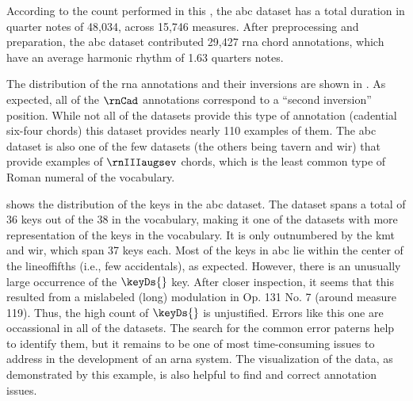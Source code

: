 
According to the count performed in this \thesisdiss{}, the
\gls{abc} dataset has a total duration in quarter notes of
48,034, across 15,746 measures. After preprocessing and
preparation, the \gls{abc} dataset contributed 29,427
\gls{rna} chord annotations, which have an average harmonic
rhythm of 1.63 \glspl{quarter} notes.

The distribution of the \gls{rna} annotations and their
inversions are shown in . As
expected, all of the $\rnCad$ annotations correspond to a
``second inversion'' position. While not all of the datasets
provide this type of annotation (cadential six-four chords)
this dataset provides nearly 110 examples of them. The
\gls{abc} dataset is also one of the few datasets (the
others being \gls{tavern} and \gls{wir}) that provide
examples of $\rnIIIaugsev$ chords, which is the least common
type of Roman numeral of the vocabulary.



 shows the distribution of the keys
in the \gls{abc} dataset. The dataset spans a total of 36
keys out of the 38 in the vocabulary, making it one of the
datasets with more representation of the keys in the
vocabulary. It is only outnumbered by the \gls{kmt} and
\gls{wir}, which span 37 keys each. Most of the keys in
\gls{abc} lie within the center of the \gls{lineoffifths}
(i.e., few accidentals), as expected. However, there is an
unusually large occurrence of the $\keyDs{}$ key. After
closer inspection, it seems that this resulted from a
mislabeled (long) modulation in Op. 131 No. 7 (around
measure 119). Thus, the high count of $\keyDs{}$ is
unjustified. Errors like this one are occassional in all of
the datasets. The search for the common error paterns help
to identify them, but it remains to be one of most
time-consuming issues to address in the development of an
\gls{arna} system. The visualization of the data, as
demonstrated by this example, is also helpful to find and
correct annotation issues.


